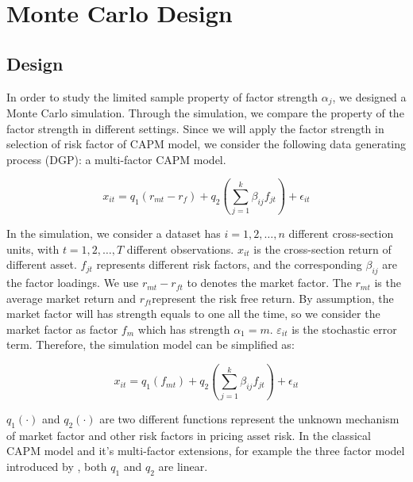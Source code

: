 \documentclass[12pt]{article}
\begin{document}
	\section{Monte Carlo Design}\label{MC}
	\subsection{Design}
In order to study the limited sample property of factor strength $\alpha_j$, we designed a Monte Carlo simulation.
Through the simulation, we compare the property of the factor strength in different settings.
Since we will apply the factor strength in selection of risk factor of CAPM model, we consider the following data generating process (DGP): a multi-factor CAPM model.

\[ x_{it} = q_1({r_{mt}} - r_f) + q_2( \sum_{j=1}^k\beta_{ij}f_{jt}) +\epsilon_{it}  \]


In the simulation, we consider a dataset has $i = 1, 2,\dots, n$ different cross-section units, with $t= 1, 2,\dots, T$ different observations. 
$x_{it}$ is the cross-section return of different asset.
$f_{jt}$ represents different risk factors, and the corresponding  $\beta_{ij}$ are the factor loadings.
We use $r_{mt} - r_{ft}$ to denotes the market factor.
The $r_{mt}$ is the average market return and $r_{ft}$represent the risk free return.
By assumption, the market factor will has strength equals to one all the time, so we consider the market factor as factor $f_{m}$ which has strength $\alpha_1 = m$.
$\varepsilon_{it}$ is the stochastic error term.
Therefore, the simulation model can be simplified as:

\[ x_{it} = q_1(f_{mt}) + q_2( \sum_{j=1}^k\beta_{ij}f_{jt}) +\epsilon_{it}  \]

$q_1(\cdot)$ and $q_2(\cdot)$ are two different functions represent the unknown mechanism of market factor and other risk factors in pricing asset risk.
In the classical CAPM model and it's multi-factor extensions, for example the three factor model introduced by , both $q_1$ and $q_2$ are linear.
\end{document}
